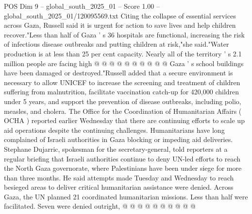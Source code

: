\begin{textsample}{POS Dim 9 – global\_south\_2025\_01 – Score 1.00 – global\_south\_2025\_01/120095569.txt}
Citing the collapse of essential services across Gaza, Russell said it is urgent for action to save lives and help children recover."Less than half of Gaza ' s 36 hospitals are functional, increasing the risk of infectious disease outbreaks and putting children at risk,"she said."Water production is at less than 25 per cent capacity.
Nearly all of the territory ' s 2.1 million people are facing high @ @ @ @ @ @ @ @ @ @ Gaza ' s school buildings have been damaged or destroyed."Russell added that a secure environment is necessary to allow UNICEF to increase the screening and treatment of children suffering from malnutrition, facilitate vaccination catch-up for 420,000 children under 5 years, and support the prevention of disease outbreaks, including polio, measles, and cholera.
The Office for the Coordination of Humanitarian Affairs ( OCHA ) reported earlier Wednesday that there are continuing efforts to scale up aid operations despite the continuing challenges.
Humanitarians have long complained of Israeli authorities in Gaza blocking or impeding aid deliveries.
Stephane Dujarric, spokesman for the secretary-general, told reporters at a regular briefing that Israeli authorities continue to deny UN-led efforts to reach the North Gaza governorate, where Palestinians have been under siege for more than three months.
He said attempts made Tuesday and Wednesday to reach besieged areas to deliver critical humanitarian assistance were denied.
Across Gaza, the UN planned 21 coordinated humanitarian missions.
Less than half were facilitated.
Seven were denied outright, @ @ @ @ @ @ @ @ @ @

\end{textsample}
